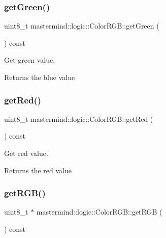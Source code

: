 \subsubsection{\texorpdfstring{get\+Green()}{getGreen()}}
{\footnotesize\ttfamily uint8\+\_\+t mastermind\+::logic\+::\+Color\+R\+G\+B\+::get\+Green (\begin{DoxyParamCaption}{ }\end{DoxyParamCaption}) const}



Get green value. 

\begin{DoxyReturn}{Returns}
the blue value 
\end{DoxyReturn}
\hypertarget{classmastermind_1_1logic_1_1_color_r_g_b_ace7e594445a112e54776f0e0a57e5478}{}\label{classmastermind_1_1logic_1_1_color_r_g_b_ace7e594445a112e54776f0e0a57e5478} 
\subsubsection{\texorpdfstring{get\+Red()}{getRed()}}
{\footnotesize\ttfamily uint8\+\_\+t mastermind\+::logic\+::\+Color\+R\+G\+B\+::get\+Red (\begin{DoxyParamCaption}{ }\end{DoxyParamCaption}) const}



Get red value. 

\begin{DoxyReturn}{Returns}
the red value 
\end{DoxyReturn}
\hypertarget{classmastermind_1_1logic_1_1_color_r_g_b_a58bbc8f966399582307612db3da39acb}{}\label{classmastermind_1_1logic_1_1_color_r_g_b_a58bbc8f966399582307612db3da39acb} 
\subsubsection{\texorpdfstring{get\+R\+G\+B()}{getRGB()}}
{\footnotesize\ttfamily uint8\+\_\+t $\ast$ mastermind\+::logic\+::\+Color\+R\+G\+B\+::get\+R\+GB (\begin{DoxyParamCaption}{ }\end{DoxyParamCaption}) const}



